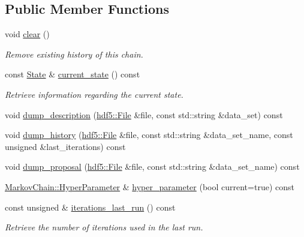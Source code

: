 \subsection*{Public Member Functions}
\begin{DoxyCompactItemize}
\item 
void \hyperlink{classeos_1_1MarkovChain_af4eb1b21be84a13ae5f421fe49ed9373}{clear} ()
\begin{DoxyCompactList}\small\item\em Remove existing history of this chain. \item\end{DoxyCompactList}\item 
const \hyperlink{structeos_1_1MarkovChain_1_1State}{State} \& \hyperlink{classeos_1_1MarkovChain_a4ba66e0d64dade9f392d2542a7c566f4}{current\_\-state} () const 
\begin{DoxyCompactList}\small\item\em Retrieve information regarding the current state. \item\end{DoxyCompactList}\item 
void \hyperlink{classeos_1_1MarkovChain_af528eb210dd7052ceeb9455cb588cdd4}{dump\_\-description} (\hyperlink{classeos_1_1hdf5_1_1File}{hdf5::File} \&file, const std::string \&data\_\-set) const 
\item 
void \hyperlink{classeos_1_1MarkovChain_aa7fc24a3066077ab60de68a5a3f8ebe5}{dump\_\-history} (\hyperlink{classeos_1_1hdf5_1_1File}{hdf5::File} \&file, const std::string \&data\_\-set\_\-name, const unsigned \&last\_\-iterations) const 
\item 
void \hyperlink{classeos_1_1MarkovChain_a89a777f8c14787db1e803995ee77d862}{dump\_\-proposal} (\hyperlink{classeos_1_1hdf5_1_1File}{hdf5::File} \&file, const std::string \&data\_\-set\_\-name) const 
\item 
\hyperlink{structeos_1_1MarkovChain_1_1HyperParameter}{MarkovChain::HyperParameter} \& \hyperlink{classeos_1_1MarkovChain_aa3055684326d68700ebeb994b878d8db}{hyper\_\-parameter} (bool current=true) const 
\item 
const unsigned \& \hyperlink{classeos_1_1MarkovChain_a3a9c62e634a375bffbb3fba0b7794b69}{iterations\_\-last\_\-run} () const 
\begin{DoxyCompactList}\small\item\em Retrieve the number of iterations used in the last run. \item\end{DoxyCompactList}\item 

\end{DoxyCompactItemize}
